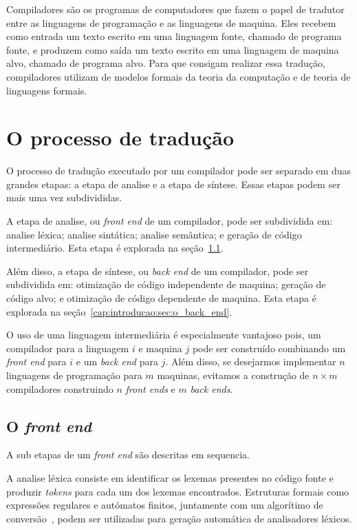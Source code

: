 \documentclass[
  12pt,
  openright,
  twoside,
  a4paper,
  english,
  brazil
]{abntex2}
\begin{document}
Compiladores são os programas de computadores que fazem o papel de tradutor entre as linguagens de programação e as linguagens de maquina.
Eles recebem como entrada um texto escrito em uma linguagem fonte, chamado de programa fonte, e produzem como saída um texto escrito em uma linguagem de maquina alvo, chamado de programa alvo.
Para que consigam realizar essa tradução, compiladores utilizam de modelos formais da teoria da computação e de teoria de linguagens formais.

\section{O processo de tradução}\label{cap:introducao:sec:o_processo_de_traducao}

O processo de tradução executado por um compilador pode ser separado em duas grandes etapas: a etapa de analise e a etapa de síntese.
Essas etapas podem ser mais uma vez subdivididas.

A etapa de analise, ou \textit{front end} de um compilador, pode ser subdividida em: analise léxica; analise sintática; analise semântica; e geração de código intermediário.
Esta etapa é explorada na seção~\ref{cap:introducao:sec:o_front_end}.

Além disso, a etapa de síntese, ou \textit{back end} de um compilador, pode ser subdividida em: otimização de código independente de maquina; geração de código alvo; e otimização de código dependente de maquina.
Esta etapa é explorada na seção~\ref{cap:introducao:sec:o_back_end}.

O uso de uma linguagem intermediária é especialmente vantajoso pois, um compilador para a linguagem $i$ e maquina $j$ pode ser construído combinando um \textit{front end} para $i$ e um \textit{back end} para $j$.
Além disso, se desejarmos implementar $n$ linguagens de programação para $m$ maquinas, evitamos a construção de $n \times m$ compiladores construindo $n$ \textit{front ends} e $m$ \textit{back ends}.

\subsection{O \textit{front end}}\label{cap:introducao:sec:o_front_end}

A sub etapas de um \textit{front end} são descritas em sequencia.

A analise léxica consiste em identificar os lexemas presentes no código fonte e produzir \textit{tokens} para cada um dos lexemas encontrados.
Estruturas formais como expressões regulares e autómatos finitos, juntamente com um algorítimo de conversão~\cite{lesk1975lex}, podem ser utilizadas para geração automática de analisadores léxicos.
\end{document}

